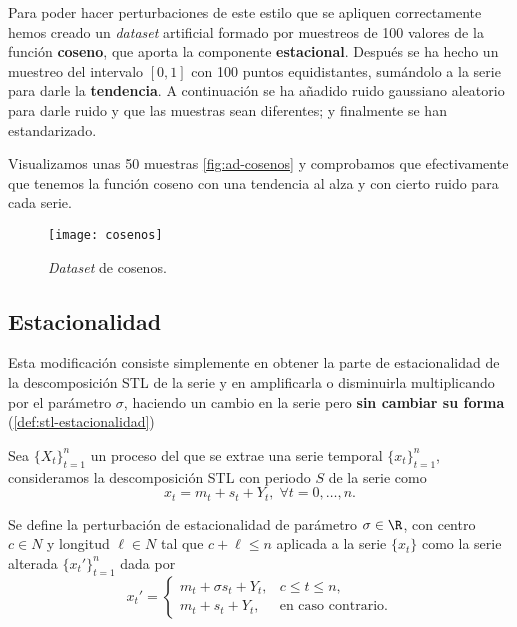 Para poder hacer perturbaciones de este estilo que se apliquen correctamente hemos creado un \emph{dataset} artificial formado por muestreos de 100 valores de la función \textbf{coseno}, que aporta la componente \textbf{estacional}. Después se ha hecho un muestreo del intervalo $[0, 1]$ con 100 puntos equidistantes, sumándolo a la serie para darle la \textbf{tendencia}. A continuación se ha añadido ruido gaussiano aleatorio para darle ruido y que las muestras sean diferentes; y finalmente se han estandarizado.

Visualizamos unas 50 muestras \autoref{fig:ad-cosenos} y comprobamos que efectivamente que tenemos la función coseno con una tendencia al alza y con cierto ruido para cada serie.

\begin{figure}[htpb]
  \centering
  \texttt{[image: cosenos]}
  \caption{\emph{Dataset} de cosenos.}
  \label{fig:ad-cosenos}
\end{figure}

\subsection{Estacionalidad}

Esta modificación consiste simplemente en obtener la parte de estacionalidad de la descomposición STL de la serie y en amplificarla o disminuirla multiplicando por el parámetro $\sigma$, haciendo un cambio en la serie pero \textbf{sin cambiar su forma} (\autoref{def:stl-estacionalidad})

\begin{definicion}
  Sea $\{X_t\}_{t = 1}^n$ un proceso del que se extrae una serie temporal $\{x_t\}_{t = 1}^n$, consideramos la descomposición STL con periodo $S$ de la serie como
  $$x_t = m_t + s_t + Y_t, \; \forall t = 0, \ldots, n.$$

  Se define la perturbación de estacionalidad de parámetro $\sigma \in \R$, con centro $c \in N$ y longitud $\ell \in N$ tal que $c + \ell \leq n$ aplicada a la serie $\{x_t\}$ como la serie alterada $\{x_t'\}_{t = 1}^n$ dada por
  $$x_t' = \begin{cases}
    m_t + \sigma s_{t} + Y_t, & c \leq t \leq n, \\
    m_t + s_t + Y_t, & \text{en caso contrario.}
  \end{cases}$$
  \label{def:stl-estacionalidad}
\end{definicion}

